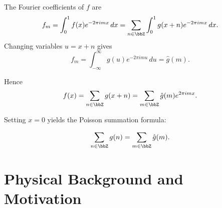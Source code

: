 The Fourier coefficients of $f$ are
\[
f_m = \int_0^1 f(x)e^{-2\pi i m x}\,dx
= \sum_{n\in\bbZ}\int_0^1 g(x+n)e^{-2\pi i m x}\,dx.
\]
Changing variables $u=x+n$ gives
\[
f_m = \int_{-\infty}^{\infty} g(u)e^{-2\pi i m u}\,du = \hat{g}(m).
\]

Hence
\[
f(x)=\sum_{n\in\bbZ} g(x+n) = \sum_{m\in\bbZ} \hat{g}(m)e^{2\pi i m x}.
\]

Setting $x=0$ yields the Poisson summation formula:
\begin{theorem}
\[
\sum_{n\in\bbZ} g(n) = \sum_{m\in\bbZ} \hat{g}(m).
\]
\end{theorem}




\label{app:Black_Holes}

\section{Physical Background and Motivation}

